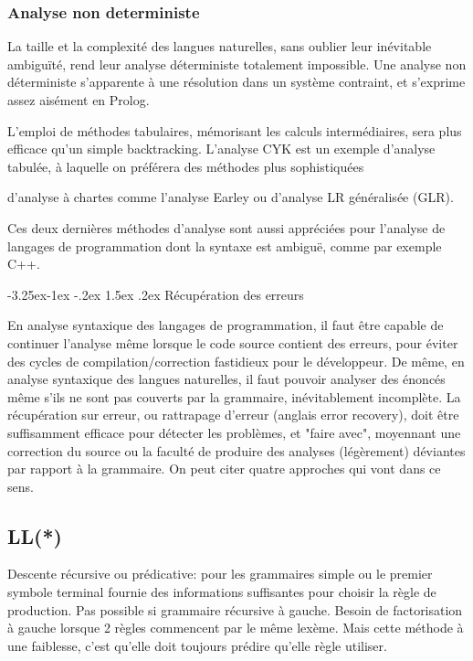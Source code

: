 \documentclass{article}
\makeatletter
\newcounter {subsubsubsection}[subsubsection]
\newcommand\subsubsubsection{\@startsection{subsubsubsection}{4}{\z@}%
                                     {-3.25ex\@plus -1ex \@minus -.2ex}%
                                     {1.5ex \@plus .2ex}%
                                     {\normalfont\normalsize\bfseries}}
\makeatother
\begin{document}
\subsubsection{Analyse non deterministe}

La taille et la complexité des langues naturelles, sans oublier leur inévitable ambiguïté, rend leur analyse déterministe totalement impossible. Une analyse non déterministe s'apparente à une résolution dans un système contraint, et s'exprime assez aisément en Prolog.

L'emploi de méthodes tabulaires, mémorisant les calculs intermédiaires, sera plus efficace qu'un simple backtracking. L'analyse CYK est un exemple d'analyse tabulée, à laquelle on préférera des méthodes plus sophistiquées

    d'analyse à chartes comme l'analyse Earley
    ou d'analyse LR généralisée (GLR).

Ces deux dernières méthodes d'analyse sont aussi appréciées pour l'analyse de langages de programmation dont la syntaxe est ambiguë, comme par exemple C++.

\subsubsubsection{Récupération des erreurs}

En analyse syntaxique des langages de programmation, il faut être capable de continuer l'analyse même lorsque le code source contient des erreurs, pour éviter des cycles de compilation/correction fastidieux pour le développeur. De même, en analyse syntaxique des langues naturelles, il faut pouvoir analyser des énoncés même s'ils ne sont pas couverts par la grammaire, inévitablement incomplète. La récupération sur erreur, ou rattrapage d'erreur (anglais error recovery), doit être suffisamment efficace pour détecter les problèmes, et "faire avec", moyennant une correction du source ou la faculté de produire des analyses (légèrement) déviantes par rapport à la grammaire. On peut citer quatre approches qui vont dans ce sens.

\subsection{LL(*)}
Descente récursive ou prédicative: pour les grammaires simple ou le premier symbole terminal fournie des informations suffisantes pour choisir la règle de production.
Pas possible si grammaire récursive à gauche.
Besoin de factorisation à gauche lorsque 2 règles commencent par le même lexème.
Mais cette méthode à une faiblesse, c’est qu’elle doit toujours prédire qu’elle règle utiliser.
\end{document}
